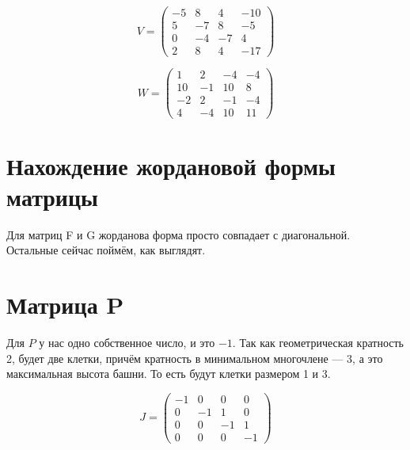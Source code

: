 \documentclass[12pt, a4paper]{article}
\begin{document}
\begin{statement}
        \begin{equation}
            V = \left(\begin{matrix}
                -5 & 8 & 4 & -10 \\
                5 & -7 & 8 & -5 \\
                0 & -4 & -7 & 4 \\
                2 & 8 & 4 & -17
            \end{matrix}\right)
        \end{equation}

        
        \begin{equation}
            W = \left(\begin{matrix}
                1 & 2 & -4 & -4 \\
                10 & -1 & 10 & 8 \\
                -2 & 2 & -1 & -4 \\
                4 & -4 & 10 & 11
            \end{matrix}\right)
        \end{equation}
    \end{statement}


    \section{Нахождение жордановой формы матрицы}


    Для матриц F и G жорданова форма просто совпадает с диагональной.
    Остальные сейчас поймём, как выглядят.

    \section{Матрица P}

    Для $P$ у нас одно собственное число, и это $-1$.
    Так как геометрическая кратность 2, будет две клетки, 
    причём кратность в минимальном многочлене — 3, а это максимальная высота башни. То есть будут клетки размером 1 и 3.
    
    \begin{equation}
        J = \left(\begin{matrix}
            -1 & 0 & 0 & 0 \\
            0 & -1 & 1 & 0 \\
            0 & 0 & -1 & 1 \\
            0 & 0 & 0 & -1
        \end{matrix}\right)
    \end{equation}
\end{document}
